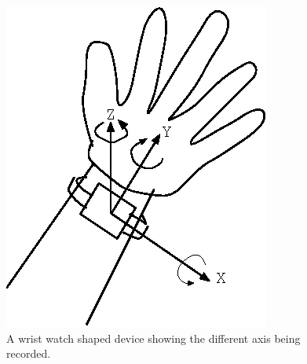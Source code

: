 \begin{figure}
\begin{center}
\includegraphics{images/HandAxis.eps}
\caption{A wrist watch shaped device showing the different axis being recorded.}
\label{fig:HandAxis}
\end{center}
\end{figure}
 
 
